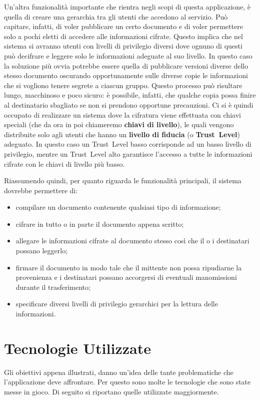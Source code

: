 Un'altra funzionalità importante che rientra negli scopi di questa applicazione, è quella di creare una gerarchia tra gli utenti che accedono al servizio. 
Può capitare, infatti, di voler pubblicare un certo documento e di voler permettere solo a pochi eletti di accedere alle informazioni cifrate. Questo implica che nel sistema si avranno utenti con livelli di privilegio diversi dove ognuno di questi può decifrare e leggere solo le informazioni adeguate al suo livello.
In questo caso la soluzione più ovvia potrebbe essere quella di pubblicare versioni diverse dello stesso documento oscurando opportunamente sulle diverse copie le informazioni che si vogliono tenere segrete a ciascun gruppo. Questo processo può risultare lungo, macchinoso e poco sicuro: è possibile, infatti, che qualche copia possa finire al destinatario sbagliato se non si prendono opportune precauzioni.
Ci si è quindi occupato di realizzare un sistema dove la cifratura viene effettuata con chiavi speciali (che da ora in poi chiameremo \textbf{chiavi di livello}), le quali vengono distribuite solo agli utenti che hanno un \textbf{livello di fiducia} (o \textbf{Trust~Level}) adeguato. In questo caso un Trust~Level basso corrisponde ad un basso livello di privilegio, mentre un Trust~Level alto garantisce l'accesso a tutte le informazioni cifrate con le chiavi di livello più basso.

Riassumendo quindi, per quanto riguarda le funzionalità principali, il sistema dovrebbe permettere di:
\begin{itemize}
	\item compilare un documento contenente qualsiasi tipo di informazione;
	\item cifrare in tutto o in parte il documento appena scritto;
	\item allegare le informazioni cifrate al documento stesso così che il o i destinatari possano leggerlo;
	\item firmare il documento in modo tale che il mittente non possa ripudiarne la provenienza e i destinatari possano accorgersi di eventuali manomissioni durante il trasferimento;
	\item specificare diversi livelli di privilegio gerarchici per la lettura delle informazioni.
\end{itemize}

\section{Tecnologie Utilizzate}
	\label{sec:tecnologie}
Gli obiettivi appena illustrati, danno un'idea delle tante problematiche che l'applicazione deve affrontare. Per questo sono molte le tecnologie che sono state messe in gioco. Di seguito si riportano quelle utilizzate maggiormente.

